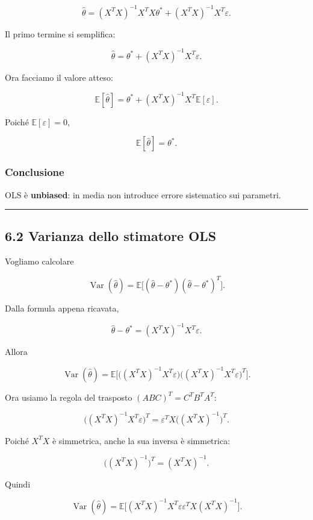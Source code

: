 \documentclass[
]{article}
\begin{document}
\[
\hat\theta=(X^TX)^{-1}X^TX\theta^* + (X^TX)^{-1}X^T\varepsilon.
\]

Il primo termine si semplifica:

\[
\hat\theta=\theta^* + (X^TX)^{-1}X^T\varepsilon.
\]

Ora facciamo il valore atteso:

\[
\mathbb{E}[\hat\theta]
=
\theta^* + (X^TX)^{-1}X^T\mathbb{E}[\varepsilon].
\]

Poiché \(\mathbb{E}[\varepsilon]=0\),

\[
\mathbb{E}[\hat\theta]=\theta^*.
\]

\subsubsection{Conclusione}\label{conclusione-4}

OLS è \textbf{unbiased}: in media non introduce errore sistematico sui
parametri.

\begin{center}\rule{0.5\linewidth}{0.5pt}\end{center}

\subsection{6.2 Varianza dello stimatore
OLS}\label{varianza-dello-stimatore-ols}

Vogliamo calcolare

\[
\operatorname{Var}(\hat\theta)
=
\mathbb{E}\big[(\hat\theta-\theta^*)(\hat\theta-\theta^*)^T\big].
\]

Dalla formula appena ricavata,

\[
\hat\theta-\theta^*=(X^TX)^{-1}X^T\varepsilon.
\]

Allora

\[
\operatorname{Var}(\hat\theta)
=
\mathbb{E}\Big[
\big((X^TX)^{-1}X^T\varepsilon\big)
\big((X^TX)^{-1}X^T\varepsilon\big)^T
\Big].
\]

Ora usiamo la regola del trasposto \((ABC)^T=C^TB^TA^T\):

\[
\big((X^TX)^{-1}X^T\varepsilon\big)^T
=
\varepsilon^TX\big((X^TX)^{-1}\big)^T.
\]

Poiché \(X^TX\) è simmetrica, anche la sua inversa è simmetrica:

\[
\big((X^TX)^{-1}\big)^T=(X^TX)^{-1}.
\]

Quindi

\[
\operatorname{Var}(\hat\theta)
=
\mathbb{E}\Big[
(X^TX)^{-1}X^T\varepsilon\varepsilon^TX(X^TX)^{-1}
\Big].
\]
\end{document}
